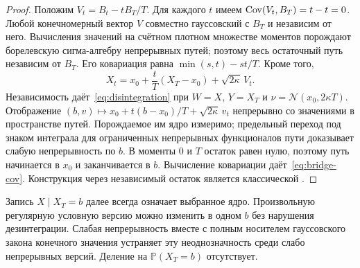 \begin{proof}
{Положим $V_t=B_t-tB_T/T$. Для каждого $t$ имеем $\operatorname{Cov}(V_t,B_T)=t-t=0$. Любой конечномерный вектор $V$ совместно гауссовский с $B_T$ и независим от него. Вычисления значений на счётном плотном множестве моментов порождают борелевскую сигма-алгебру непрерывных путей; поэтому весь остаточный путь независим от $B_T$. Его ковариация равна $\min(s,t)-st/T$. Кроме того,}
\[
X_t=x_0+\frac{t}{T}(X_T-x_0)+\sqrt{2\kappa}\,V_t.
\]
{Независимость даёт~\eqref{eq:disintegration} при $W=X$, $Y=X_T$ и $\nu=\mathcal N(x_0,2\kappa T)$. Отображение $(b,v)\mapsto x_0+t(b-x_0)/T+\sqrt{2\kappa}\,v_t$ непрерывно со значениями в пространстве путей. Порождаемое им ядро измеримо; предельный переход под знаком интеграла для ограниченных непрерывных функционалов пути доказывает слабую непрерывность по $b$. В моменты $0$ и $T$ остаток равен нулю, поэтому путь начинается в $x_0$ и заканчивается в $b$. Вычисление ковариации даёт~\eqref{eq:bridge-cov}. Конструкция через независимый остаток является классической \cite[Theorem 22.1 and following remark]{Pitman2003}.}
\end{proof}

{Запись $X\mid X_T=b$ далее всегда означает выбранное ядро. Произвольную регулярную условную версию можно изменить в одном $b$ без нарушения дезинтеграции. Слабая непрерывность вместе с полным носителем гауссовского закона конечного значения устраняет эту неоднозначность среди слабо непрерывных версий. Деление на $\mathbb P(X_T=b)$ отсутствует.}


